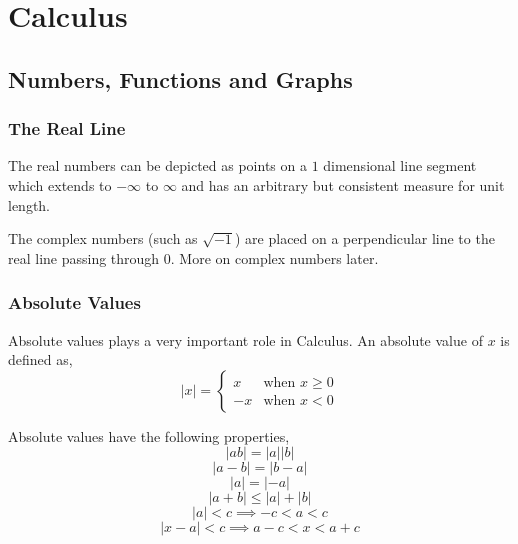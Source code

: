 \documentclass[a4paper]{book}
\begin{document}
\part{Calculus}

\chapter{Numbers, Functions and Graphs}
\section{The Real Line}
The real numbers can be depicted as points on a $1$ dimensional line segment which extends to $-\infty$ to $\infty$ and has an arbitrary but consistent measure for unit length.

\setlength\fboxrule{0pt}

The complex numbers (such as $\sqrt{-1}$) are placed on a perpendicular line to the real line passing through $0$. More on complex numbers later.

\section{Absolute Values}
Absolute values plays a very important role in Calculus. An absolute value of $x$ is defined as,
\begin{equation}
|x| = 
\begin{cases}
	 x& \text{when } x \geq 0\\
	-x& \text{when } x < 0
\end{cases}
\end{equation}

Absolute values have the following properties,
\begin{equation}
|ab| = |a||b|
\end{equation}
\begin{equation}
|a - b| = |b - a|
\end{equation}
\begin{equation}
|a| = |-a|
\end{equation}
\begin{equation}
|a + b| \leq |a| + |b|
\end{equation}
\begin{equation}
|a| < c \implies -c < a < c
\end{equation}
\begin{equation}
|x - a| < c \implies a - c < x < a + c
\end{equation}
\end{document}
